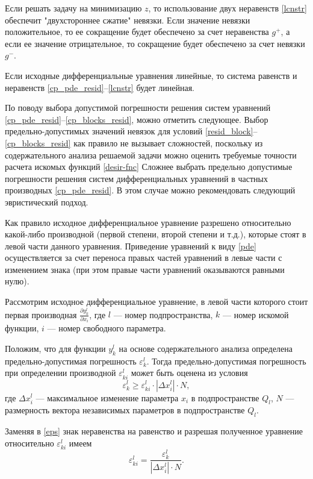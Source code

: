 \documentclass[a4paper,12pt]{article}
\begin{document}
Если решать задачу на минимизацию $z$, то использование двух
неравенств \eqref{lcnstr} обеспечит "двухстороннее сжатие" невязки.
Если значение невязки положительное, то ее сокращение будет обеспечено
за счет неравенства $g^{+}$, а если ее значение отрицательное, то
сокращение будет обеспечено за счет невязки $g^{-}$.

Если исходные дифференциальные уравнения линейные, то система равенств
и неравенств \eqref{cp_pde_resid}--\eqref{lcnstr} будет линейная.

По поводу выбора допустимой погрешности решения систем уравнений
\eqref{cp_pde_resid}--\eqref{cp_blocks_resid}, можно отметить
следующее. Выбор предельно-допустимых значений невязок для условий 
\eqref{resid_block}--\eqref{cp_blocks_resid} как правило не вызывает
сложностей, поскольку из содержательного анализа решаемой задачи можно 
оценить требуемые точности расчета искомых функций \eqref{desir-fnc}
Сложнее выбрать предельно допустимые погрешности решения систем
дифференциальных уравнений в частных производных \eqref{cp_pde_resid}.
В этом случае можно рекомендовать  следующий эвристический подход.

Как правило исходное дифференциальное уравнение разрешено относительно 
какой-либо производной (первой степени, второй степени и т.д.),
которые стоят в левой части данного уравнения. Приведение уравнений к
виду \eqref{pde} осуществляется за счет переноса правых частей
уравнений в левые части с изменением знака (при этом правые части
уравнений оказываются равными нулю).

Рассмотрим исходное дифференциальное уравнение, в левой части которого
стоит первая производная $\frac{\partial y^l_k}{\partial x_i}$, где
$l$ --- номер подпространства, $k$ --- номер искомой функции, $i$ ---
номер свободного параметра.

Положим, что для функции $y^l_k$ на основе содержательного анализа
определена предельно-допустимая погрешность $\varepsilon^l_k$. Тогда
предельно-допустимая погрешность при определении производной 
$\varepsilon^l_{ki}$ может быть оценена из условия
\begin{equation}
    \varepsilon^l_k \ge \varepsilon^l_{ki}\cdot \left| \Delta x^l_i
    \right| \cdot N,
    \label{eps}
\end{equation}
где $\Delta x^l_i$ --- максимальное изменение параметра $x_i$ в
подпространстве $Q_l$, $N$ --- размерность вектора независимых
параметров в подпространстве $Q_l$.

Заменяя в \eqref{eps} знак неравенства на равенство и разрешая
полученное уравнение относительно $\varepsilon^{l}_{ki}$ имеем
\begin{equation*}
    \varepsilon^{l}_{ki} = \frac{\varepsilon^l_k}{\left|\Delta x^l_i
    \right| \cdot N}.
\end{equation*}
\end{document}
